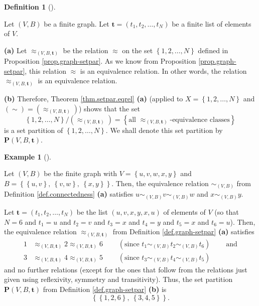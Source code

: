 \documentclass[numbers=enddot,12pt,final,onecolumn,notitlepage]{scrartcl}%
\theoremstyle{definition}
\newtheorem{defi}[theo]{Definition}
\newenvironment{definition}[1][]
{\begin{defi}[#1]\begin{leftbar}}
{\end{leftbar}\end{defi}}
\newtheorem{exmp}[theo]{Example}
\newenvironment{example}[1][]
{\begin{exmp}[#1]\begin{leftbar}}
{\end{leftbar}\end{exmp}}
\begin{document}
\begin{definition}
\label{def.graph-setpar}Let $\left(  V,B\right)  $ be a finite graph. Let
$\mathbf{t}=\left(  t_{1},t_{2},\ldots,t_{N}\right)  $ be a finite list of
elements of $V$.

\textbf{(a)} Let $\approx_{\left(  V,B,\mathbf{t}\right)  }$ be the relation
$\approx$ on the set $\left\{  1,2,\ldots,N\right\}  $ defined in Proposition
\ref{prop.graph-setpar}. As we know from Proposition \ref{prop.graph-setpar},
this relation $\approx$ is an equivalence relation. In other words, the
relation $\approx_{\left(  V,B,\mathbf{t}\right)  }$ is an equivalence relation.

\textbf{(b)} Therefore, Theorem \ref{thm.setpar.eqrel} \textbf{(a)} (applied
to $X=\left\{  1,2,\ldots,N\right\}  $ and $\left(  \sim\right)  =\left(
\approx_{\left(  V,B,\mathbf{t}\right)  }\right)  $) shows that the set%
\[
\left\{  1,2,\ldots,N\right\}  /\left(  \approx_{\left(  V,B,\mathbf{t}%
\right)  }\right)  =\left\{  \text{all }\approx_{\left(  V,B,\mathbf{t}%
\right)  }\text{-equivalence classes}\right\}
\]
is a set partition of $\left\{  1,2,\ldots,N\right\}  $. We shall denote this
set partition by $\mathbf{P}\left(  V,B,\mathbf{t}\right)  $.
\end{definition}

\begin{example}
Let $\left(  V,B\right)  $ be the finite graph with $V=\left\{
u,v,w,x,y\right\}  $ and $B=\left\{  \left\{  u,v\right\}  ,\ \left\{
v,w\right\}  ,\ \left\{  x,y\right\}  \right\}  $. Then, the equivalence
relation $\sim_{\left(  V,B\right)  }$ from Definition \ref{def.connectedness}
\textbf{(a)} satisfies $u\sim_{\left(  V,B\right)  }v\sim_{\left(  V,B\right)
}w$ and $x\sim_{\left(  V,B\right)  }y$.

Let $\mathbf{t}=\left(  t_{1},t_{2},\ldots,t_{N}\right)  $ be the list
$\left(  u,v,x,y,x,u\right)  $ of elements of $V$ (so that $N=6$ and $t_{1}=u$
and $t_{2}=v$ and $t_{3}=x$ and $t_{4}=y$ and $t_{5}=x$ and $t_{6}=u$). Then,
the equivalence relation $\approx_{\left(  V,B,\mathbf{t}\right)  }$ from
Definition \ref{def.graph-setpar} \textbf{(a)} satisfies%
\begin{align*}
1  &  \approx_{\left(  V,B,\mathbf{t}\right)  }2\approx_{\left(
V,B,\mathbf{t}\right)  }6\ \ \ \ \ \ \ \ \ \ \left(  \text{since }t_{1}%
\sim_{\left(  V,B\right)  }t_{2}\sim_{\left(  V,B\right)  }t_{6}\right)
\ \ \ \ \ \ \ \ \ \ \text{and}\\
3  &  \approx_{\left(  V,B,\mathbf{t}\right)  }4\approx_{\left(
V,B,\mathbf{t}\right)  }5\ \ \ \ \ \ \ \ \ \ \left(  \text{since }t_{3}%
\sim_{\left(  V,B\right)  }t_{4}\sim_{\left(  V,B\right)  }t_{5}\right)
\end{align*}
and no further relations (except for the ones that follow from the relations
just given using reflexivity, symmetry and transitivity). Thus, the set
partition $\mathbf{P}\left(  V,B,\mathbf{t}\right)  $ from Definition
\ref{def.graph-setpar} \textbf{(b)} is%
\[
\left\{  \left\{  1,2,6\right\}  ,\ \left\{  3,4,5\right\}  \right\}  .
\]

\end{example}
\end{document}
